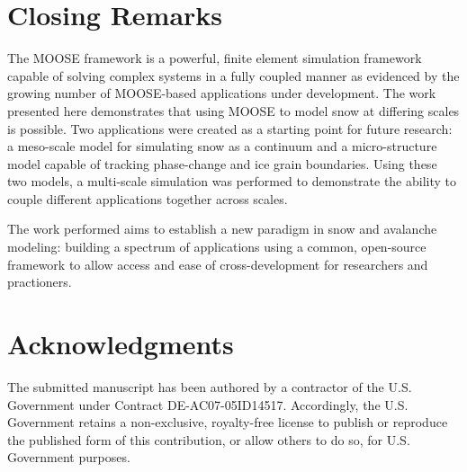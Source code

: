\section{Closing Remarks}
The MOOSE framework is a powerful, finite element simulation framework capable of solving complex systems in a fully coupled manner as evidenced by the growing number of MOOSE-based applications under development. The work presented here demonstrates that using MOOSE to model snow at differing scales is possible. Two applications were created as a starting point for future research: a meso-scale model for simulating snow as a continuum and a micro-structure model capable of tracking phase-change and ice grain boundaries. Using these two models, a multi-scale simulation was performed to demonstrate the ability to couple different applications together across scales.

The work performed aims to establish a new paradigm in snow and avalanche modeling: building a spectrum of applications using a common, open-source framework to allow access and ease of cross-development for researchers and practioners.


\section{Acknowledgments}
The submitted manuscript has been authored by a contractor of the
U.S. Government under Contract DE-AC07-05ID14517. Accordingly, the
U.S. Government retains a non-exclusive, royalty-free license to
publish or reproduce the published form of this contribution, or allow
others to do so, for U.S. Government purposes.
